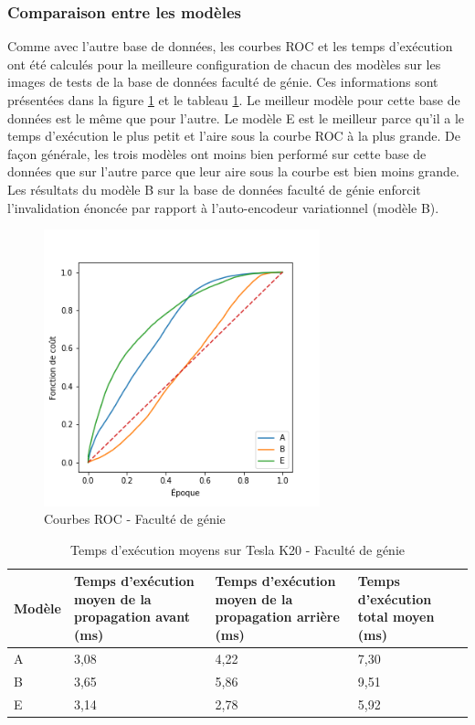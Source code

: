 \subsubsection{Comparaison entre les modèles}
    Comme avec l'autre base de données, les courbes ROC et les temps d'exécution ont été calculés pour la meilleure configuration de chacun des modèles sur les images de tests de la base de données faculté de génie. Ces informations sont présentées dans la figure \ref{fig:corridor_roc} et le tableau \ref{tab:resultat_corridor_temps_execution}. Le meilleur modèle pour cette base de données est le même que pour l'autre. Le modèle E est le meilleur parce qu'il a le temps d'exécution le plus petit et l'aire sous la courbe ROC à la plus grande. De façon générale, les trois modèles ont moins bien performé sur cette base de données que sur l'autre parce que leur aire sous la courbe est bien moins grande. Les résultats du modèle B sur la base de données faculté de génie enforcit l'invalidation énoncée par rapport à l'auto-encodeur variationnel (modèle B).
    
    \begin{figure}[H]
        \centering
        \includegraphics[width=8cm]{images/corridor_roc.png}
        \caption{Courbes ROC - Faculté de génie}
        \label{fig:corridor_roc}
    \end{figure}

    \begin{table}[H]
        \centering
        \caption{Temps d'exécution moyens sur Tesla K20 - Faculté de génie}
        \label{tab:resultat_corridor_temps_execution}
        \begin{tabular}{lp{4cm}p{4cm}p{4cm}}
            \midrule
            Modèle & Temps d'exécution moyen de la propagation avant (ms) & Temps d'exécution moyen de la propagation arrière (ms) & Temps d'exécution total moyen (ms)\\
            \midrule\midrule
            A & 3,08 & 4,22 & 7,30\\
            B & 3,65 & 5,86 & 9,51\\
            E & 3,14 & 2,78 & 5,92\\
            \midrule
        \end{tabular}
    \end{table}
    
